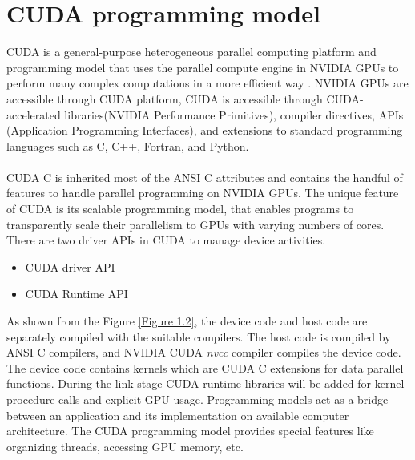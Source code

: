 \section{CUDA programming model}
CUDA is a general-purpose heterogeneous parallel computing platform and programming model that uses the parallel compute engine in NVIDIA GPUs to perform many complex computations in a more efficient way \cite{ProfessionalCUDA}. NVIDIA GPUs are accessible through CUDA platform, CUDA is accessible through CUDA-accelerated libraries(NVIDIA Performance Primitives), compiler directives, APIs (Application Programming Interfaces), and extensions to standard programming languages such as C, C++, Fortran, and Python.
\paragraph*{} CUDA C is inherited most of the ANSI C attributes and contains the handful of features to handle parallel programming on NVIDIA GPUs. The unique feature of CUDA is its scalable programming model, that enables programs to transparently scale their parallelism to GPUs with varying numbers of cores. There are two driver APIs in CUDA to manage device activities.
\begin{itemize} 
\item CUDA driver API
\item CUDA Runtime API
\end{itemize}
As shown from the Figure \ref{Figure 1.2}, the device code and host code are separately compiled with the suitable compilers. The host code is compiled by ANSI C compilers, and NVIDIA CUDA \textit{nvcc} compiler compiles the device code. The device code contains kernels which are CUDA C extensions for data parallel functions. During the link stage CUDA runtime libraries will be added for kernel procedure calls and explicit GPU usage. Programming models act as a bridge between an application and its implementation on available computer architecture\cite{ProfessionalCUDA}. The CUDA programming model provides special features like organizing threads, accessing GPU memory, etc.

